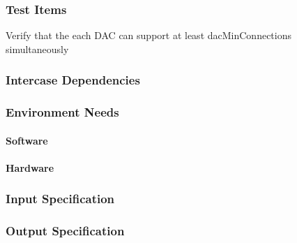 \subsubsection{Test Items}
Verify that the each DAC can support at least dacMinConnections
simultaneously



\subsubsection{Intercase Dependencies}

\subsubsection{Environment Needs}

\paragraph{Software}

\paragraph{Hardware}

\subsubsection{Input Specification}

\subsubsection{Output Specification}

